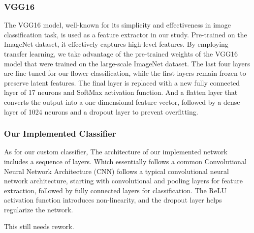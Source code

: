 \subsubsection{VGG16}

The VGG16 model, well-known for its simplicity and effectiveness in image classification task, is used as a feature extractor in our study. Pre-trained on the ImageNet dataset, it effectively captures high-level features.
By employing transfer learning, we take advantage of the pre-trained weights of the VGG16 model that were trained on the large-scale ImageNet dataset.
The last four layers are fine-tuned for our flower classification, while the first layers remain frozen to preserve latent features. The final layer is replaced with a new fully connected layer of 17 neurons and SoftMax activation function.
And a flatten layer that converts the output into a one-dimensional feature vector, followed by a dense layer of 1024 neurons and a dropout layer to prevent overfitting.

\subsubsection{Our Implemented Classifier}

As for our custom classifier,  The architecture of our implemented network includes a sequence of layers. Which essentially follows a common Convolutional Neural Network Architecture (CNN)
follows a typical convolutional neural network architecture, starting with convolutional and pooling layers for feature extraction, followed by fully connected layers for classification.
The ReLU activation function introduces non-linearity, and the dropout layer helps regularize the network.



    {\color{red} This still needs rework.}
